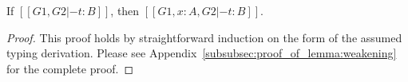 \begin{lemma}[Weakening]
  \label{lemma:weakening}
  If $[[G1,G2 |- t : B]]$, then $[[G1,x : A,G2 |- t : B]]$.
\end{lemma}
\begin{proof}
  This proof holds by straightforward induction on the form of the
  assumed typing derivation.  Please see
  Appendix~\ref{subsubsec:proof_of_lemma:weakening} for the complete
  proof.
\end{proof}
